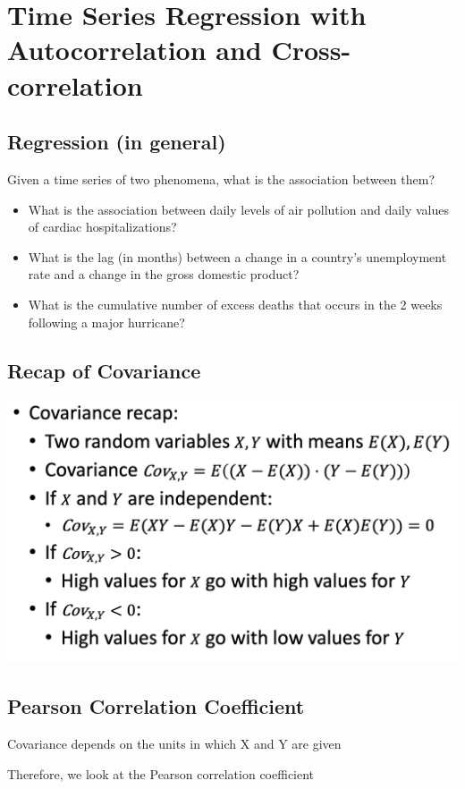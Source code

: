 \documentclass[11pt]{article}
\theoremstyle{definition}
\begin{document}
\section{Time Series Regression with
Autocorrelation and
Cross-correlation}
\subsection{Regression (in general)}
Given a time series of two phenomena, what is the association
between them?

\begin{itemize}
  \item What is the association between daily levels of air pollution and daily
  values of cardiac hospitalizations?
  \item What is the lag (in months) between a change in a country’s
  unemployment rate and a change in the gross domestic product?
  \item What is the cumulative number of excess deaths that occurs in the 2
  weeks following a major hurricane?
\end{itemize}

\subsection{Recap of Covariance}
\includegraphics[width=\textwidth/2]{5.png}

\subsection{Pearson Correlation Coefficient}
Covariance depends on the units in which X and Y are given

Therefore, we look at the Pearson correlation coefficient
\end{document}
